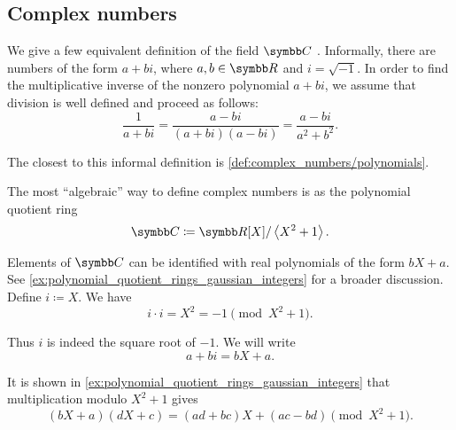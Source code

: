 \subsection{Complex numbers}\label{subsec:complex_numbers}

\begin{definition}\label{def:complex_numbers}
  We give a few equivalent definition of the field \( \C \) . Informally, there are numbers of the form \( a + bi \), where \( a, b \in \R \) and \( i = \sqrt{-1} \). In order to find the multiplicative inverse of the nonzero polynomial \( a + bi \), we assume that division is well defined and proceed as follows:
  \begin{equation}\label{def:complex_numbers/inverse}
    \frac 1 {a + bi} = \frac {a - bi} {(a + bi)(a - bi)} = \frac{a - bi}{a^2 + b^2}.
  \end{equation}

  The closest to this informal definition is \cref{def:complex_numbers/polynomials}.

  \begin{defenum}
     The most \enquote{algebraic} way to define complex numbers is as the polynomial quotient ring
    \begin{equation*}
      \C \coloneqq \R[X] / \Gen{X^2 + 1}.
    \end{equation*}

    Elements of \( \C \) can be identified with real polynomials of the form \( bX + a \). See \cref{ex:polynomial_quotient_rings_gaussian_integers} for a broader discussion.
    Define \( i \coloneqq X \). We have
    \begin{equation*}
      i \cdot i = X^2 = -1 \pmod {X^2 + 1}.
    \end{equation*}

    Thus \( i \) is indeed the square root of \( -1 \). We will write
    \begin{equation*}
      a + bi = bX + a.
    \end{equation*}

    It is shown in \cref{ex:polynomial_quotient_rings_gaussian_integers} that multiplication modulo \( X^2 + 1 \) gives
    \begin{equation}\label{def:complex_numbers/polynomials/multiplication}
     (bX + a) (dX + c) = (ad + bc)X + (ac - bd) \pmod {X^2 + 1}.
    \end{equation}


\end{defenum}
\end{definition}
